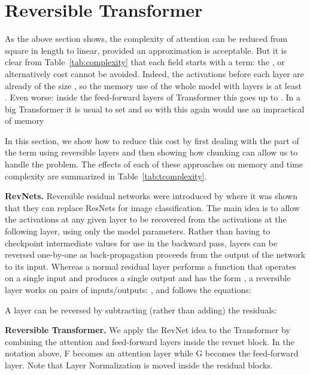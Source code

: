 \documentclass{article} \usepackage{iclr2020_conference,times}
\renewcommand{\paragraph}[1]{\textbf{#1}}
\begin{document}
\section{Reversible Transformer} \label{sec:reversible}

As the above section shows, the complexity of attention can be reduced
from square in length to linear, provided an approximation is acceptable.
But it is clear from Table~\ref{tab:complexity} that each field starts
with a  term: the , 
or alternatively  cost
cannot be avoided. Indeed, the activations before each layer are already
of the size , so the memory use of the whole model with 
layers is at least . Even worse: inside the feed-forward layers of 
Transformer this goes up to . In a big Transformer
it is usual to set  and  so with  this again
would use an impractical  of memory

In this section, we show how to reduce this cost by first dealing with the
 part of the term using reversible layers and then showing how chunking
can allow us to handle the  problem.
The effects of each of these approaches on memory and time complexity are summarized in Table~\ref{tab:tcomplexity}.


\paragraph{RevNets.}
Reversible residual networks were introduced by \citet{gomez2017reversible} where it was shown
that they can replace ResNets for image classification.
The main idea is to allow the activations at any given layer to be recovered from the activations at the following layer, using only the model parameters. Rather than having to checkpoint intermediate values for use in the backward pass, layers can be reversed one-by-one as back-propagation proceeds from the output of the network to its input. Whereas a normal residual layer performs a function  that operates on a single input and produces a single output and has the form , a reversible layer works on pairs of inputs/outputs: , and follows the equations:


A layer can be reversed by subtracting (rather than adding) the residuals:



\paragraph{Reversible Transformer.}
We apply the RevNet idea to the Transformer by combining the attention and
feed-forward layers inside the revnet block. In the notation above,
F becomes an attention layer while G becomes the feed-forward layer. Note that Layer Normalization \citep{layernorm2016} is moved inside the residual blocks.
\end{document}
